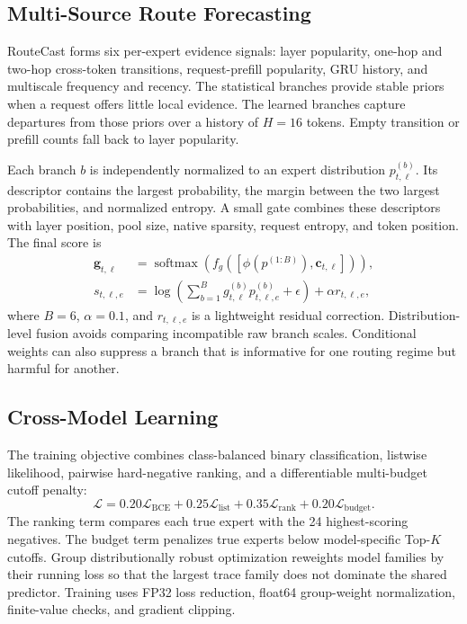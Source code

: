 \documentclass[conference]{IEEEtran}
\begin{document}
\subsection{Multi-Source Route Forecasting}
RouteCast forms six per-expert evidence signals: layer popularity, one-hop and two-hop cross-token transitions, request-prefill popularity, GRU history, and multiscale frequency and recency. The statistical branches provide stable priors when a request offers little local evidence. The learned branches capture departures from those priors over a history of $H=16$ tokens. Empty transition or prefill counts fall back to layer popularity.

Each branch $b$ is independently normalized to an expert distribution $p^{(b)}_{t,\ell}$. Its descriptor contains the largest probability, the margin between the two largest probabilities, and normalized entropy. A small gate combines these descriptors with layer position, pool size, native sparsity, request entropy, and token position. The final score is
\begin{align}
\mathbf{g}_{t,\ell}
&=\operatorname{softmax}\!\left(f_g([\phi(p^{(1:B)}),\mathbf{c}_{t,\ell}])\right),\\
s_{t,\ell,e}
&=\log\!\left(\sum_{b=1}^{B}g^{(b)}_{t,\ell}p^{(b)}_{t,\ell,e}+\epsilon\right)
+\alpha r_{t,\ell,e},
\label{eq:fusion}
\end{align}
where $B=6$, $\alpha=0.1$, and $r_{t,\ell,e}$ is a lightweight residual correction. Distribution-level fusion avoids comparing incompatible raw branch scales. Conditional weights can also suppress a branch that is informative for one routing regime but harmful for another.

\subsection{Cross-Model Learning}
The training objective combines class-balanced binary classification, listwise likelihood, pairwise hard-negative ranking, and a differentiable multi-budget cutoff penalty:
\begin{equation}
\mathcal{L}=0.20\mathcal{L}_{\mathrm{BCE}}
+0.25\mathcal{L}_{\mathrm{list}}
+0.35\mathcal{L}_{\mathrm{rank}}
+0.20\mathcal{L}_{\mathrm{budget}}.
\label{eq:total-loss}
\end{equation}
The ranking term compares each true expert with the 24 highest-scoring negatives. The budget term penalizes true experts below model-specific Top-$K$ cutoffs. Group distributionally robust optimization reweights model families by their running loss so that the largest trace family does not dominate the shared predictor. Training uses FP32 loss reduction, float64 group-weight normalization, finite-value checks, and gradient clipping.
\end{document}
